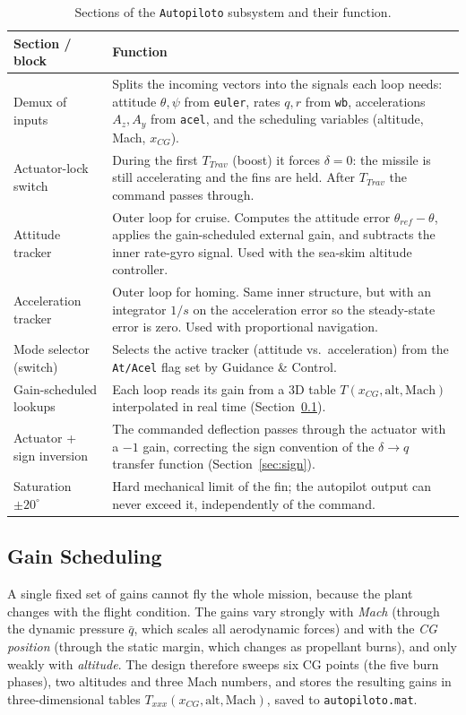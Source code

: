 \begin{table}[H]
\centering
\caption{Sections of the \texttt{Autopiloto} subsystem and their function.}
\label{tab:ap_blocks}
\begin{tabular}{p{}p{}}
\toprule
Section / block & Function \\
\midrule
Demux of inputs & Splits the incoming vectors into the signals each loop needs: attitude $\theta,\psi$ from \texttt{euler}, rates $q,r$ from \texttt{wb}, accelerations $A_z,A_y$ from \texttt{acel}, and the scheduling variables (altitude, Mach, $x_{CG}$). \\
Actuator-lock switch & During the first $T_{Trav}$ (boost) it forces $\delta=0$: the missile is still accelerating and the fins are held. After $T_{Trav}$ the command passes through. \\
Attitude tracker & Outer loop for cruise. Computes the attitude error $\theta_{ref}-\theta$, applies the gain-scheduled external gain, and subtracts the inner rate-gyro signal. Used with the sea-skim altitude controller. \\
Acceleration tracker & Outer loop for homing. Same inner structure, but with an integrator $1/s$ on the acceleration error so the steady-state error is zero. Used with proportional navigation. \\
Mode selector (switch) & Selects the active tracker (attitude vs.\ acceleration) from the \texttt{At/Acel} flag set by Guidance \& Control. \\
Gain-scheduled lookups & Each loop reads its gain from a 3D table $T(x_{CG},\text{alt},\text{Mach})$ interpolated in real time (Section~\ref{sec:sched}). \\
Actuator + sign inversion & The commanded deflection passes through the actuator with a $-1$ gain, correcting the sign convention of the $\delta\rightarrow q$ transfer function (Section~\ref{sec:sign}). \\
Saturation $\pm 20^\circ$ & Hard mechanical limit of the fin; the autopilot output can never exceed it, independently of the command. \\
\bottomrule
\end{tabular}
\end{table}

\subsection{Gain Scheduling}
\label{sec:sched}

A single fixed set of gains cannot fly the whole mission, because the plant changes with the flight condition. The gains vary strongly with \emph{Mach} (through the dynamic pressure $\bar q$, which scales all aerodynamic forces) and with the \emph{CG position} (through the static margin, which changes as propellant burns), and only weakly with \emph{altitude}. The design therefore sweeps six CG points (the five burn phases), two altitudes and three Mach numbers, and stores the resulting gains in three-dimensional tables $T_{xxx}(x_{CG},\text{alt},\text{Mach})$, saved to \texttt{autopiloto.mat}.


